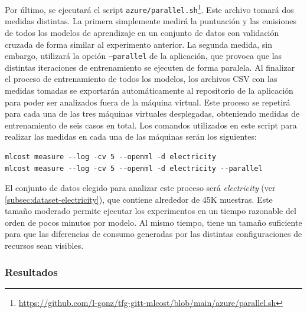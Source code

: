 

Por último, se ejecutará el script \texttt{azure/parallel.sh}\footnote{\url{https://github.com/l-gonz/tfg-gitt-mlcost/blob/main/azure/parallel.sh}}. Este archivo tomará dos medidas distintas. La primera simplemente medirá la puntuación y las emisiones de todos los modelos de aprendizaje en un conjunto de datos con validación cruzada de forma similar al experimento anterior. La segunda medida, sin embargo, utilizará la opción \texttt{--parallel} de la aplicación, que provoca que las distintas iteraciones de entrenamiento se ejecuten de forma paralela. Al finalizar el proceso de entrenamiento de todos los modelos, los archivos CSV con las medidas tomadas se exportarán automáticamente al repositorio de la aplicación para poder ser analizados fuera de la máquina virtual. Este proceso se repetirá para cada una de las tres máquinas virtuales desplegadas, obteniendo medidas de entrenamiento de seis casos en total. Los comandos utilizados en este script para realizar las medidas en cada una de las máquinas serán los siguientes:
\begin{verbatim}
mlcost measure --log -cv 5 --openml -d electricity
mlcost measure --log -cv 5 --openml -d electricity --parallel
\end{verbatim}

El conjunto de datos elegido para analizar este proceso será \emph{electricity} (ver \ref{subsec:dataset-electricity}), que contiene alrededor de 45K muestras. Este tamaño moderado permite ejecutar los experimentos en un tiempo razonable del orden de pocos minutos por modelo. Al mismo tiempo, tiene un tamaño suficiente para que las diferencias de consumo generadas por las distintas configuraciones de recursos sean visibles. 


\subsubsection{Resultados}

